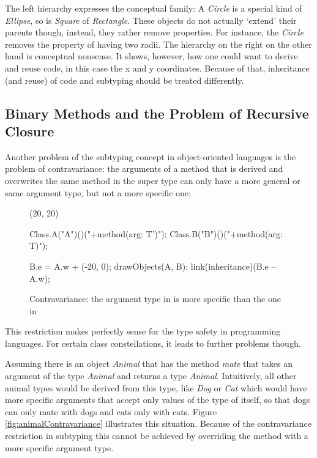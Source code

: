 The left hierarchy expresses the conceptual family: A \emph{Circle}
is a special kind of \emph{Ellipse}, so is \emph{Square} of
\emph{Rectangle}. These objects do not actually `extend' their
parents though, instead, they rather remove properties. For instance, the
\emph{Circle} removes the property of having two radii.	The hierarchy on
the right on the other hand is conceptual nonsense. It shows, however,
how one could want to derive and reuse code, in this case the x and
y coordinates. Because of that, inheritance (and reuse) of code and
subtyping should be treated differently.

\subsection{Binary Methods and the Problem of Recursive Closure}
\label{sec:recursiveClosure}
Another problem of the subtyping concept in object-oriented languages is
the problem of contravariance: the arguments of a method that is derived
and overwrites the same method in the super type can only have a more
general or same argument type, but not a more specific one:

\begin{figure}[H]
	\centering
	\begin{emp}[classdiag](20, 20)

		Class.A("A")()("+method(arg: T')");
		Class.B("B")()("+method(arg: T)");

		B.e = A.w + (-20, 0);
		drawObjects(A, B);
		link(inheritance)(B.e -- A.w);

	\end{emp}
	\caption{Contravariance: the argument type in \B is more specific than the one in \A}
	\label{fig:contravariance}
\end{figure}

This restriction makes perfectly sense for the type safety in
programming languages. For certain class constellations, it leads to
further problems though.

Assuming there is an object \emph{Animal} that has the method
\emph{mate} that takes an argument of the type \emph{Animal} and
returns a type \emph{Animal}. Intuitively, all other animal types
would be derived from this type, like \emph{Dog} or \emph{Cat} which
would have more specific arguments that accept only values of the type
of itself, so that dogs can only mate with dogs and cats only with
cats\cite{simons_theory_2003-1}. Figure \ref{fig:animalContravariance}
illustrates this situation. Because of the contravariance restriction
in subtyping this cannot be achieved by overriding the method with a
more specific argument type.

